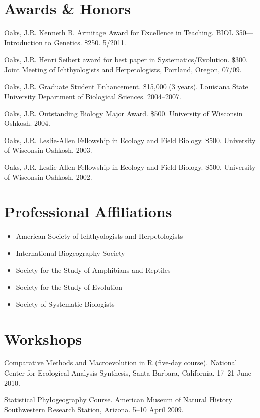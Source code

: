 \documentclass[10pt]{article}
\newenvironment{myItemize}{
  \begin{itemize}
    \setlength{\leftskip}{-4mm}
    \setlength{\itemsep}{0.25em}
    \setlength{\parskip}{0pt}
    \setlength{\parsep}{0.5em}}
  {\end{itemize}}
\newcommand{\myHangIndent}{\hangindent=5mm}
\begin{document}
\section*{Awards \& Honors}
\myHangIndent
Oaks, J.R.
Kenneth B. Armitage Award for Excellence in Teaching.
BIOL 350---Introduction to Genetics.
\$250.
5/2011.

\myHangIndent
Oaks, J.R.
Henri Seibert award for best paper in Systematics/Evolution.
\$300.
Joint Meeting of Ichthyologists and Herpetologists, Portland, Oregon, 07/09.

\myHangIndent
Oaks, J.R.
Graduate Student Enhancement.
\$15,000 (3 years).
Louisiana State University Department of Biological Sciences.
2004--2007.

\myHangIndent
Oaks, J.R.
Outstanding Biology Major Award.
\$500.
University of Wisconsin Oshkosh.
2004.

\myHangIndent
Oaks, J.R.
Leslie-Allen Fellowship in Ecology and Field Biology.
\$500.
University of Wisconsin Oshkosh.
2003.

\myHangIndent
Oaks, J.R.
Leslie-Allen Fellowship in Ecology and Field Biology.
\$500.
University of Wisconsin Oshkosh.
2002.

\section*{Professional Affiliations}
\begin{myItemize}
\item American Society of Ichthyologists and Herpetologists
\item International Biogeography Society
\item Society for the Study of Amphibians and Reptiles
\item Society for the Study of Evolution
\item Society of Systematic Biologists
\end{myItemize}

\section*{Workshops}
\myHangIndent
Comparative Methods and Macroevolution in R (five-day course).
National Center for Ecological Analysis Synthesis, Santa Barbara, California.
17--21 June 2010.

\myHangIndent
Statistical Phylogeography Course.
American Museum of Natural History Southwestern Research Station, Arizona.
5--10 April 2009.
\end{document}
